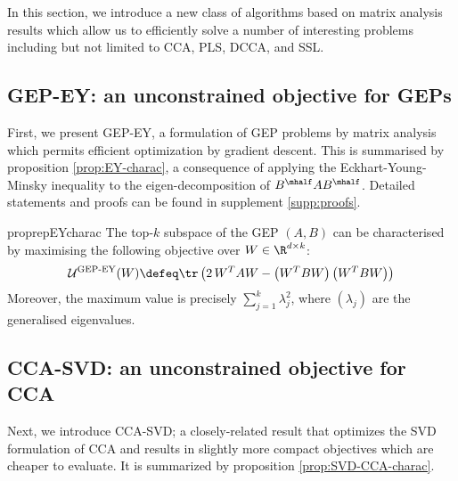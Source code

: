 In this section, we introduce a new class of algorithms based on matrix analysis results which allow us to efficiently solve a number of interesting problems including but not limited to CCA, PLS, DCCA, and SSL.

\subsection{GEP-EY: an unconstrained objective for GEPs}\label{sec:gep-ey-formulation}

First, we present GEP-EY, a formulation of GEP problems by matrix analysis which permits efficient optimization by gradient descent. 
This is summarised by proposition \ref{prop:EY-charac}, a consequence of applying the Eckhart-Young-Minsky inequality \cite{stewart_matrix_1990} to the eigen-decomposition of $B^\mhalf A B^\mhalf$. Detailed statements and proofs can be found in supplement \ref{supp:proofs}.

\begin{restatable}{proprep}{EYcharac}
\label{prop:EY-charac}
    The top-$k$ subspace of the GEP $(A,B)$ can be characterised by maximising the following objective over $W \in \R^{d \times k}$:
    \begin{align}\label{eq:EY-charac}
        \mathcal{U}^\text{GEP-EY}(W) \defeq \tr \left( 2\, W^T A W - \left(W^T B W\right) \left(W^T B W\right) \right)
    \end{align}
    Moreover, the maximum value is precisely $\sum_{j=1}^k \lambda_j^2$, where $(\lambda_j)$ are the generalised eigenvalues.
\end{restatable}

\subsection{CCA-SVD: an unconstrained objective for CCA}\label{sec:gep-ey-formulation}
Next, we introduce CCA-SVD; a closely-related result that optimizes the SVD formulation of CCA and results in slightly more compact objectives which are cheaper to evaluate. It is summarized by proposition \ref{prop:SVD-CCA-charac}.

